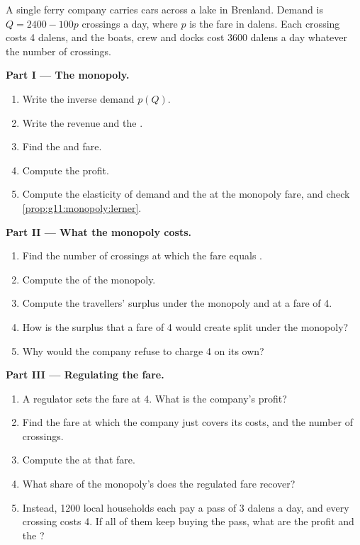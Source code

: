 \begin{problem}
\label{pb:g11:monopoly:1}
A single ferry company carries cars across a lake in Brenland. Demand is $Q = 2400 - 100p$ crossings a day, where $p$ is the fare in dalens. Each crossing costs 4 dalens,
and the boats, crew and docks cost 3600 dalens a day whatever the number of crossings.

\medskip
\noindent\textbf{Part I --- The monopoly.}
\begin{enumerate}
\item Write the inverse demand $p(Q)$.
\item Write the revenue and the .
\item Find the  and fare.
\item Compute the profit.
\item Compute the elasticity of demand and the  at the monopoly fare, and check \cref{prop:g11:monopoly:lerner}.
\end{enumerate}

\medskip
\noindent\textbf{Part II --- What the monopoly costs.}
\begin{enumerate}[resume]
\item Find the number of crossings at which the fare equals .
\item Compute the  of the monopoly.
\item Compute the travellers' surplus under the monopoly and at a fare of 4.
\item How is the surplus that a fare of 4 would create split under the monopoly?
\item Why would the company refuse to charge 4 on its own?
\end{enumerate}

\medskip
\noindent\textbf{Part III --- Regulating the fare.}
\begin{enumerate}[resume]
\item A regulator sets the fare at 4. What is the company's profit?
\item Find the fare at which the company just covers its costs, and the number of crossings.
\item Compute the  at that fare.
\item What share of the monopoly's  does the regulated fare recover?
\item Instead, 1200 local households each pay a pass of 3 dalens a day, and every crossing costs 4. If all of them keep buying the pass, what are the profit and the
?
\end{enumerate}


\end{problem}
